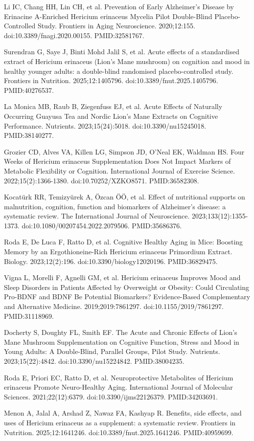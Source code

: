 \documentclass[11pt,oneside]{book}
\newcommand{\reff}[2]{\par\hangindent=7mm\hangafter=1\noindent[#1]\hspace{2mm}#2\par}
\begin{document}
\reff{41}{Li IC, Chang HH, Lin CH, et al. Prevention of Early Alzheimer's Disease by Erinacine A-Enriched Hericium erinaceus Mycelia Pilot Double-Blind Placebo-Controlled Study. Frontiers in Aging Neuroscience. 2020;12:155. doi:10.3389/fnagi.2020.00155. PMID:32581767.}
\reff{42}{Surendran G, Saye J, Binti Mohd Jalil S, et al. Acute effects of a standardised extract of Hericium erinaceus (Lion's Mane mushroom) on cognition and mood in healthy younger adults: a double-blind randomised placebo-controlled study. Frontiers in Nutrition. 2025;12:1405796. doi:10.3389/fnut.2025.1405796. PMID:40276537.}
\reff{43}{La Monica MB, Raub B, Ziegenfuss EJ, et al. Acute Effects of Naturally Occurring Guayusa Tea and Nordic Lion's Mane Extracts on Cognitive Performance. Nutrients. 2023;15(24):5018. doi:10.3390/nu15245018. PMID:38140277.}
\reff{44}{Grozier CD, Alves VA, Killen LG, Simpson JD, O'Neal EK, Waldman HS. Four Weeks of Hericium erinaceus Supplementation Does Not Impact Markers of Metabolic Flexibility or Cognition. International Journal of Exercise Science. 2022;15(2):1366-1380. doi:10.70252/XZKO8571. PMID:36582308.}
\reff{45}{Kocatürk RR, Temizyürek A, Özcan ÖÖ, et al. Effect of nutritional supports on malnutrition, cognition, function and biomarkers of Alzheimer's disease: a systematic review. The International Journal of Neuroscience. 2023;133(12):1355-1373. doi:10.1080/00207454.2022.2079506. PMID:35686376.}
\reff{46}{Roda E, De Luca F, Ratto D, et al. Cognitive Healthy Aging in Mice: Boosting Memory by an Ergothioneine-Rich Hericium erinaceus Primordium Extract. Biology. 2023;12(2):196. doi:10.3390/biology12020196. PMID:36829475.}
\reff{47}{Vigna L, Morelli F, Agnelli GM, et al. Hericium erinaceus Improves Mood and Sleep Disorders in Patients Affected by Overweight or Obesity: Could Circulating Pro-BDNF and BDNF Be Potential Biomarkers? Evidence-Based Complementary and Alternative Medicine. 2019;2019:7861297. doi:10.1155/2019/7861297. PMID:31118969.}
\reff{48}{Docherty S, Doughty FL, Smith EF. The Acute and Chronic Effects of Lion's Mane Mushroom Supplementation on Cognitive Function, Stress and Mood in Young Adults: A Double-Blind, Parallel Groups, Pilot Study. Nutrients. 2023;15(22):4842. doi:10.3390/nu15224842. PMID:38004235.}
\reff{49}{Roda E, Priori EC, Ratto D, et al. Neuroprotective Metabolites of Hericium erinaceus Promote Neuro-Healthy Aging. International Journal of Molecular Sciences. 2021;22(12):6379. doi:10.3390/ijms22126379. PMID:34203691.}
\reff{50}{Menon A, Jalal A, Arshad Z, Nawaz FA, Kashyap R. Benefits, side effects, and uses of Hericium erinaceus as a supplement: a systematic review. Frontiers in Nutrition. 2025;12:1641246. doi:10.3389/fnut.2025.1641246. PMID:40959699.}
\end{document}
